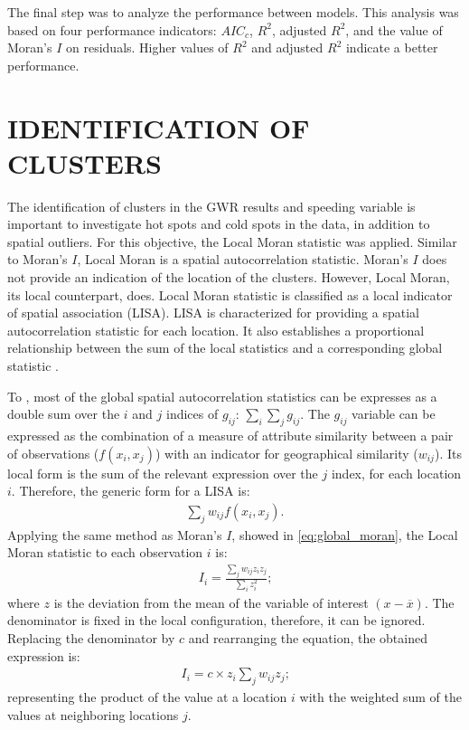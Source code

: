 The final step was to analyze the performance between models. This analysis was based on four performance indicators: $AIC_c$, $R^2$, adjusted $R^2$, and the value of Moran's $I$ on residuals. Higher values of $R^2$ and adjusted $R^2$ indicate a better performance.

\section{IDENTIFICATION OF CLUSTERS} \label{sec:cluster}




The identification of clusters in the GWR results and speeding variable is important to investigate hot spots and cold spots in the data, in addition to spatial outliers. For this objective, the Local Moran statistic was applied. Similar to Moran's $I$, Local Moran is a spatial autocorrelation statistic. Moran's $I$ does not provide an indication of the location of the clusters. However, Local Moran, its local counterpart, does. Local Moran statistic is classified as a local indicator of spatial association (LISA). LISA is characterized for providing a spatial autocorrelation statistic for each location. It also establishes a proportional relationship between the sum of the local statistics and a corresponding global statistic \cite{anselinLocalIndicatorsSpatial2010,anselinLocalSpatialAutocorrelation2020}.

To \textcite{anselinLocalSpatialAutocorrelation2020}, most of the global spatial autocorrelation statistics can be expresses as a double sum over the $i$ and $j$ indices of $g_{ij}$: $\sum_i \sum_j g_{ij}$. The $g_{ij}$ variable can be expressed as the combination of a measure of attribute similarity between a pair of observations ($f(x_i, x_j)$) with an indicator for geographical similarity ($w_{ij}$). Its local form is the sum of the relevant expression over the $j$ index, for each location $i$. Therefore, the generic form for a LISA is: \begin{align}
    \sum_j w_{ij} f\left(x_i, x_j\right) \mbox{.}
\end{align} Applying the same method as Moran's $I$, showed in \autoref{eq:global_moran}, the Local Moran statistic to each observation $i$ is: \begin{align}
    I_i = \frac{\sum_j w_{ij} z_i z_j}{\sum_i z_i^2} \mbox{;}
\end{align} where $z$ is the deviation from the mean of the variable of interest $(x - \overline{x})$. The denominator is fixed in the local configuration, therefore, it can be ignored. Replacing the denominator by $c$ and rearranging the equation, the obtained expression is: \begin{align}
    I_i = c \times z_i \sum_j w_{ij} z_j \mbox{;}
\end{align} representing the product of the value at a location $i$ with the weighted sum of the values at neighboring locations $j$.

